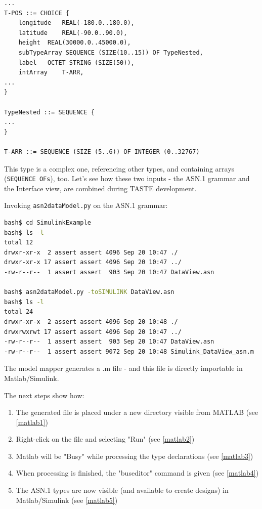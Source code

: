 \documentclass[11pt]{book}
\begin{document}
\begin{lstlisting}[language=aadl]
...
T-POS ::= CHOICE {
    longitude	REAL(-180.0..180.0),
    latitude	REAL(-90.0..90.0),
    height	REAL(30000.0..45000.0),
    subTypeArray SEQUENCE (SIZE(10..15)) OF TypeNested,
    label	OCTET STRING (SIZE(50)),
    intArray	T-ARR,
...    
}

TypeNested ::= SEQUENCE {
...
}

T-ARR ::= SEQUENCE (SIZE (5..6)) OF INTEGER (0..32767)

\end{lstlisting}

This type is a complex one, referencing other types, and containing arrays ({\tt SEQUENCE OFs}), too.
Let's see how these two inputs - the ASN.1 grammar and the Interface view, are combined during TASTE development.

Invoking {\tt asn2dataModel.py} on the ASN.1 grammar:

\begin{lstlisting}[language=bash]
bash$ cd SimulinkExample
bash$ ls -l
total 12
drwxr-xr-x  2 assert assert 4096 Sep 20 10:47 ./
drwxr-xr-x 17 assert assert 4096 Sep 20 10:47 ../
-rw-r--r--  1 assert assert  903 Sep 20 10:47 DataView.asn

bash$ asn2dataModel.py -toSIMULINK DataView.asn
bash$ ls -l
total 24
drwxr-xr-x  2 assert assert 4096 Sep 20 10:48 ./
drwxrwxrwt 17 assert assert 4096 Sep 20 10:47 ../
-rw-r--r--  1 assert assert  903 Sep 20 10:47 DataView.asn
-rw-r--r--  1 assert assert 9072 Sep 20 10:48 Simulink_DataView_asn.m
\end{lstlisting}

The model mapper generates a .m file - and this file is directly importable in Matlab/Simulink.

The next steps show how:
\begin{enumerate}
\item The generated file is placed under a new directory visible from MATLAB (see \ref{matlab1})
\item Right-click on the file and selecting "Run" (see \ref{matlab2})
\item Matlab will be "Busy" while processing the type declarations (see \ref{matlab3})
\item When processing is finished, the "buseditor" command is given (see \ref{matlab4})
\item The ASN.1 types are now visible (and available to create designs) in Matlab/Simulink (see \ref{matlab5})
\end{enumerate}
\end{document}

